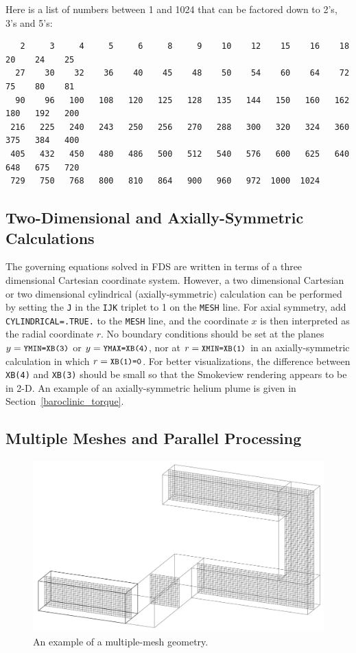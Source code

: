\documentclass[11pt]{book}
\newcommand{\ct}{\tt\small}
\begin{document}
Here is a list of numbers between 1 and 1024 that can be factored
down to 2's, 3's and 5's:

\footnotesize
\begin{verbatim}
   2     3     4     5     6     8     9    10    12    15    16    18    20    24    25
  27    30    32    36    40    45    48    50    54    60    64    72    75    80    81
  90    96   100   108   120   125   128   135   144   150   160   162   180   192   200
 216   225   240   243   250   256   270   288   300   320   324   360   375   384   400
 405   432   450   480   486   500   512   540   576   600   625   640   648   675   720
 729   750   768   800   810   864   900   960   972  1000  1024
\end{verbatim}
\normalsize


\subsection{Two-Dimensional and Axially-Symmetric Calculations}
\label{info:2D}

The governing equations solved in FDS are written in terms of a
three dimensional Cartesian coordinate system. However,
a two dimensional Cartesian or two dimensional cylindrical
(axially-symmetric) calculation can be performed by setting the {\ct J} in the {\ct IJK} triplet
to 1 on the {\ct MESH} line. For axial symmetry, add {\ct CYLINDRICAL=.TRUE.} to the
{\ct MESH} line, and the coordinate $x$ is then interpreted as the radial coordinate $r$.
No boundary conditions should be set at the planes $y=\hbox{\ct YMIN=XB(3)}$ or
$y=\hbox{\ct YMAX=XB(4)}$, nor at $r=\hbox{\ct XMIN=XB(1)}$ in an axially-symmetric
calculation in which $r=\hbox{\ct XB(1)=0}$. For better visualizations, the difference between
{\ct XB(4)} and {\ct XB(3)} should be small so that the Smokeview rendering appears to be in 2-D.
An example of an axially-symmetric helium plume is given in Section~\ref{baroclinic_torque}.


\subsection{Multiple Meshes and Parallel Processing}
\label{info:multimesh}


\begin{figure}[ht!]
\includegraphics[width=\textwidth]{FIGURES/hallways}
\caption{An example of a multiple-mesh geometry.}
\label{fig:domain}
\end{figure}
\end{document}
